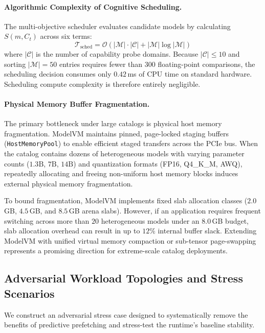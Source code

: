 \paragraph{Algorithmic Complexity of Cognitive Scheduling.}
The multi-objective scheduler evaluates candidate models by calculating $S(m, C_t)$ across six terms:
\begin{equation}
\mathcal{T}_{\text{sched}} = \mathcal{O}(|\mathcal{M}| \cdot |\mathcal{C}| + |\mathcal{M}| \log |\mathcal{M}|)
\end{equation}
where $|\mathcal{C}|$ is the number of capability probe domains. Because $|\mathcal{C}| \le 10$ and sorting $|\mathcal{M}| = 50$ entries requires fewer than $300$ floating-point comparisons, the scheduling decision consumes only $0.42$\,ms of CPU time on standard hardware. Scheduling compute complexity is therefore entirely negligible.

\paragraph{Physical Memory Buffer Fragmentation.}
The primary bottleneck under large catalogs is physical host memory fragmentation. ModelVM maintains pinned, page-locked staging buffers (\texttt{HostMemoryPool}) to enable efficient staged transfers across the PCIe bus. When the catalog contains dozens of heterogeneous models with varying parameter counts ($1.3\text{B}$, $7\text{B}$, $14\text{B}$) and quantization formats (FP16, Q4\_K\_M, AWQ), repeatedly allocating and freeing non-uniform host memory blocks induces external physical memory fragmentation.

To bound fragmentation, ModelVM implements fixed slab allocation classes ($2.0$\,GB, $4.5$\,GB, and $8.5$\,GB arena slabs). However, if an application requires frequent switching across more than $20$ heterogeneous models under an $8.0$\,GB budget, slab allocation overhead can result in up to $12\%$ internal buffer slack. Extending ModelVM with unified virtual memory compaction or sub-tensor page-swapping represents a promising direction for extreme-scale catalog deployments.

\subsection{Adversarial Workload Topologies and Stress Scenarios}
\label{sec:lim_adversarial}

We construct an adversarial stress case designed to systematically remove the benefits of predictive prefetching and stress-test the runtime's baseline stability.

